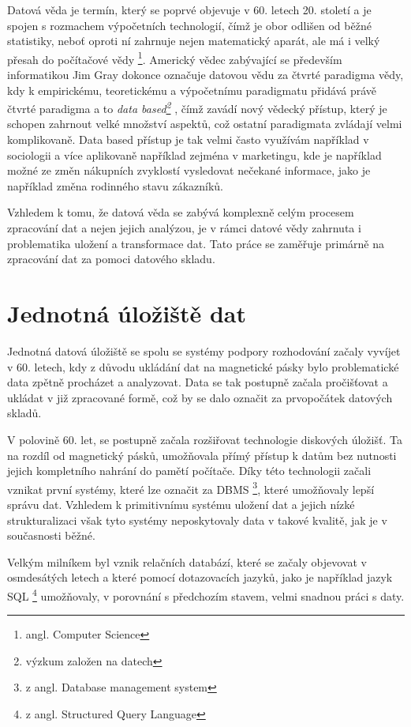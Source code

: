 \documentclass[
  digital,     %
  twoside,     %
  lof,         %
  lot,         %
]{fithesis4}
\begin{document}
 Datová věda je termín, který se poprvé objevuje v 60. letech 20. století a je spojen s rozmachem výpočetních technologií, čímž je obor odlišen od běžné statistiky, neboť  oproti ní zahrnuje nejen matematický aparát, ale má i velký přesah do počítačové vědy \footnote{angl. Computer Science
 }.   \parencite{Foote2021} Americký vědec zabývající se především informatikou Jim Gray dokonce označuje datovou vědu za čtvrté paradigma vědy, kdy k empirickému, teoretickému a výpočetnímu paradigmatu přidává právě čtvrté paradigma a to \emph{data based\footnote{výzkum založen na datech}} \parencite{hey2009fourth}, čímž zavádí nový vědecký přístup, který je schopen zahrnout velké množství aspektů, což ostatní paradigmata zvládají velmi komplikovaně. Data based přístup je tak velmi často využívám například v sociologii a více aplikovaně například zejména v marketingu, kde je například možné ze změn nákupních zvyklostí vysledovat nečekané informace, jako je například změna rodinného stavu zákazníků.\parencite{Zeleny2015}
 
Vzhledem k tomu, že datová věda se zabývá komplexně celým procesem zpracování dat a nejen jejich analýzou, je v rámci datové vědy zahrnuta i problematika uložení a transformace dat. Tato práce se zaměřuje primárně na zpracování dat za pomoci datového skladu. 

\chapter {Jednotná úložiště dat}
Jednotná datová úložiště se spolu se systémy podpory rozhodování začaly vyvíjet v 60. letech, kdy z důvodu ukládání dat na magnetické pásky bylo problematické data zpětně procházet a analyzovat. Data se tak postupně začala pročišťovat a ukládat v již zpracované formě, což by se dalo označit za prvopočátek datových skladů.\parencite[s.~2]{Inmon2005}

V polovině 60. let, se postupně začala rozšiřovat technologie diskových úložišť. Ta na rozdíl od magnetický pásků, umožňovala přímý přístup k datům bez nutnosti jejich kompletního nahrání do pamětí počítače. Díky této technologii začali vznikat první systémy, které lze označit za DBMS \footnote{z angl. Database management system}, které umožňovaly lepší správu dat.\parencite{Foote19042018} Vzhledem k primitivnímu systému uložení dat a jejich nízké strukturalizaci však tyto systémy neposkytovaly data v takové kvalitě, jak je v současnosti běžné.

Velkým milníkem byl vznik relačních databází, které se začaly objevovat v osmdesátých letech a které pomocí dotazovacích jazyků, jako je například jazyk SQL \footnote{z angl. Structured Query Language} umožňovaly, v porovnání s předchozím stavem, velmi snadnou práci s daty.\parencite{Foote19042018}
\end{document}
